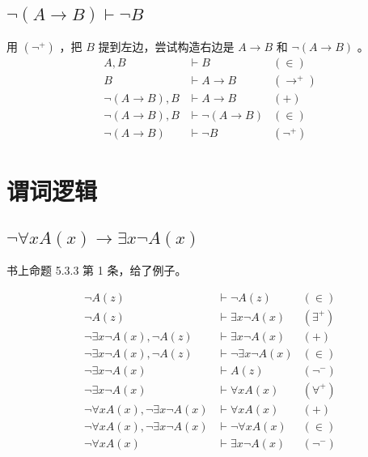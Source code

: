 \documentclass[UTF8]{ctexart}
\begin{document}
    \subsection*{$\lnot (A \to B) \vdash \lnot B$}
    用 $(\lnot^{+})$ ，把 $B$ 提到左边，尝试构造右边是 $A \to B$ 和 $\lnot(A \to B)$ 。
    \begin{align*}
        A, B & \vdash B & (\in) \\
        B & \vdash A \to B & (\to^{+}) \\
        \lnot (A \to B), B & \vdash A \to B & (+) \\
        \lnot (A \to B), B & \vdash \lnot (A \to B) & (\in) \\
        \lnot (A \to B) & \vdash \lnot B & (\lnot^{+})
    \end{align*}

    \newpage
    
    \section{谓词逻辑}

    \subsection{$\lnot \forall x A(x) \to \exists x \lnot A(x)$}
    书上命题 5.3.3 第 1 条，给了例子。

    \begin{align*}
        \lnot A(z) & \vdash \lnot A(z) & (\in) \\
        \lnot A(z) & \vdash \exists x \lnot A(x) & (\exists^{+}) \\
        \lnot \exists x \lnot A(x), \lnot A(z) & \vdash \exists x \lnot A(x) & (+) \\
        \lnot \exists x \lnot A(x), \lnot A(z) & \vdash \lnot \exists x \lnot A(x) & (\in) \\
        \lnot \exists x \lnot A(x) & \vdash A(z) & (\lnot^{-}) \\
        \lnot \exists x \lnot A(x) & \vdash \forall x A(x) & (\forall^{+}) \\
        \lnot \forall x A(x), \lnot \exists x \lnot A(x) & \vdash \forall x A(x) & (+) \\
        \lnot \forall x A(x), \lnot \exists x \lnot A(x) & \vdash \lnot \forall x A(x) & (\in) \\
        \lnot \forall x A(x) & \vdash \exists x \lnot A(x) & (\lnot^{-})
    \end{align*}
\end{document}
